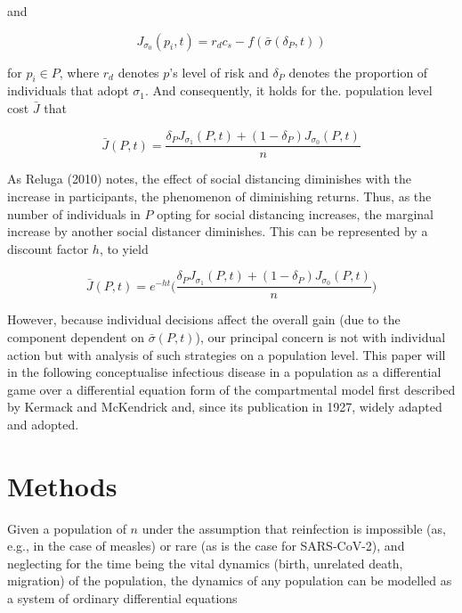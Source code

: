 \documentclass{article}
\begin{document}
\noindent and

\begin{equation}
	J_{\sigma_0}(p_i, t) = r_d c_s - f(\bar{\sigma}(\delta_P, t))
\end{equation}

\noindent for $p_i \in P$, where $r_d$ denotes $p$'s level of risk and $\delta_P$ denotes the proportion of individuals that adopt $\sigma_1$. And consequently, it holds for the. population level cost $\bar{J}$ that

\begin{equation}
	\bar{J}(P, t) = \frac{\delta_P J_{\sigma_1}(P, t) + (1 - \delta_P) J_{\sigma_0}(P, t)}{n}
\end{equation}

As Reluga (2010) notes, the effect of social distancing diminishes with the increase in participants, the phenomenon of diminishing returns.\cite{reluga2010game} Thus, as the number of individuals in $P$ opting for social distancing increases, the marginal increase by another social distancer diminishes. This can be represented by a discount factor $h$, to yield

\begin{equation}
	\bar{J}(P, t) = e^{-ht} \Big( \frac{\delta_P J_{\sigma_1}(P, t) + (1 - \delta_P) J_{\sigma_0}(P, t)}{n} \Big)
\end{equation}

However, because individual decisions affect the overall gain (due to the component dependent on $\bar{\sigma}(P, t)$), our principal concern is not with individual action but with analysis of such strategies on a population level. This paper will in the following conceptualise infectious disease in a population as a differential game over a differential equation form of the compartmental model first described by Kermack and McKendrick\cite{kermack1927contribution} and, since its publication in 1927, widely adapted and adopted.\cite{vstvepan2007kermack,roberts1999kermack,capasso1978generalization}


\section{Methods} %
\label{sec:methods}

Given a population of $n$ under the assumption that reinfection is impossible (as, e.g., in the case of measles) or rare (as is the case for SARS-CoV-2\cite{edridge2020human,deng2020primary,bao2020reinfection}), and neglecting for the time being the vital dynamics (birth, unrelated death, migration) of the population, the dynamics of any population can be modelled as a system of ordinary differential equations
\end{document}
